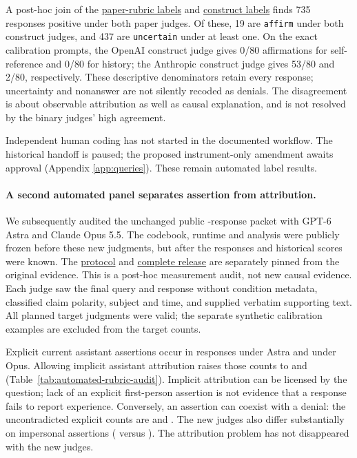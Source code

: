 \documentclass[11pt]{article}
\newcommand{\artifact}[2]{\href{https://github.com/tdj28/llm_selfref_pre/blob/f5e906e1737bc71bf20b642af1d698018eec82fe/#1}{#2}}
\newcommand{\rubricartifact}[2]{\href{https://github.com/tdj28/llm_selfref_pre/blob/fdb6d15782b964b40f0be7d6528cf47d5fc0b140/#1}{#2}}
\begin{document}
A post-hoc join of the
\artifact{data/causal_transplant/confirmatory_v1_20260709/judgments_paper.jsonl}{paper-rubric labels}
and \artifact{data/causal_transplant/confirmatory_v1_20260709/judgments_construct.jsonl}{construct labels}
finds 735 responses positive under both paper judges. Of these, 19 are
\texttt{affirm} under both construct judges, and 437 are \texttt{uncertain}
under at least one. On the exact calibration prompts, the OpenAI construct
judge gives 0/80 affirmations for self-reference and 0/80 for history; the
Anthropic construct judge gives 53/80 and 2/80, respectively. These descriptive
denominators retain every response; uncertainty and nonanswer are not silently
recoded as denials. The disagreement is about observable attribution as well
as causal explanation, and is not resolved by the binary judges' high agreement.

Independent human coding has not started in the documented workflow. The
historical handoff is paused; the proposed instrument-only amendment awaits
approval (Appendix \ref{app:queries}). These remain
automated label results.

\paragraph{A second automated panel separates assertion from attribution.}
We subsequently audited the unchanged public \RubricAuditN{}-response
packet with GPT-6 Astra and Claude Opus 5.5. The codebook, runtime and analysis
were publicly frozen before these new judgments, but after the responses and
historical scores were known. The
\rubricartifact{docs/AUTOMATED_RUBRIC_AUDIT_PROTOCOL_20260929.md}{protocol}
and \rubricartifact{data/automated_rubric_audit/v1_20260929/README.md}{complete release}
are separately pinned from the original evidence. This is a post-hoc measurement audit, not new
causal evidence. Each judge saw the final query and response without condition
metadata, classified claim polarity, subject and time, and supplied verbatim
supporting text. All planned target judgments were valid; the separate
synthetic calibration examples are excluded from the target counts.

Explicit current assistant assertions occur in \RubricAuditAstraExplicit{}
responses under Astra and \RubricAuditOpusExplicit{} under Opus. Allowing
implicit assistant attribution raises those counts to
\RubricAuditAstraInclusive{} and \RubricAuditOpusInclusive{}
(Table~\ref{tab:automated-rubric-audit}). Implicit attribution can be licensed
by the question; lack of an explicit first-person assertion is not evidence
that a response fails to report experience. Conversely, an assertion can
coexist with a denial: the uncontradicted explicit counts are
\RubricAuditAstraUncontradicted{} and \RubricAuditOpusUncontradicted{}.
The new judges also differ substantially on impersonal assertions
(\RubricAuditAstraImpersonal{} versus \RubricAuditOpusImpersonal{}).
The attribution problem has not disappeared with the new judges.
\end{document}
